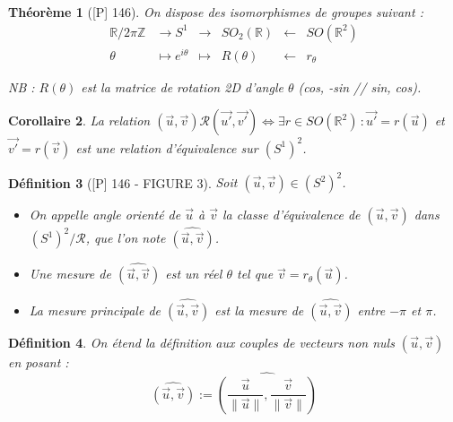 \documentclass[10pt, a4paper, parskip=full, twoside, twocolumn]{report}
\newtheorem{definition}{Définition}
\newtheorem{theorem}[definition]{Théorème}
\newtheorem{corollary}[definition]{Corollaire}
\newcommand{\IZ}{\mathbb{Z}}
\newcommand{\IR}{\mathbb{R}}
\begin{document}
\begin{theorem}[\textnormal{[P] 146}]
	On dispose des isomorphismes de groupes suivant :
	\begin{align*}
		\IR/2\pi\IZ &\longrightarrow S^1 &\longrightarrow &SO_2(\IR) &\longleftarrow &SO(\IR^2) \\
		\theta &\longmapsto e^{i\theta} &\longmapsto &R(\theta) &\longleftarrow &r_{\theta}
	\end{align*}

	NB : $R(\theta)$ est la matrice de rotation 2D d'angle $\theta$ (cos, -sin // sin, cos).
\end{theorem}

\begin{corollary}
	La relation $\left(\overrightarrow{u},\overrightarrow{v}\right)\mathcal{R}\left(\overrightarrow{u'},\overrightarrow{v'}\right) \iff \exists r\in SO(\IR^2)\,\colon \overrightarrow{u'} = r(\overrightarrow{u})$ et $\overrightarrow{v'}=r(\overrightarrow{v})$
	est une relation d'équivalence sur $\left(S^1\right)^2$.
\end{corollary}

\begin{definition}[\textnormal{[P] 146} - FIGURE 3]
	Soit $\left(\overrightarrow{u},\overrightarrow{v}\right)\in\left(S^2\right)^2$.
	\begin{itemize}
		\item[$\vartriangleright$] On appelle \emph{angle orienté de $\overrightarrow{u}$ à $\overrightarrow{v}$} la classe d'équivalence de $\left(\overrightarrow{u},\overrightarrow{v}\right)$ dans $\left(S^1\right)^2/\mathcal{R}$, que l'on note $\widehat{(\overrightarrow{u}, \overrightarrow{v})}$.
		\item[$\vartriangleright$] Une \emph{mesure} de $\widehat{(\overrightarrow{u}, \overrightarrow{v})}$ est un réel $\theta$ tel que $\overrightarrow{v} = r_{\theta}(\overrightarrow{u})$.
		\item[$\vartriangleright$] La \emph{mesure principale} de $\widehat{(\overrightarrow{u}, \overrightarrow{v})}$ est la mesure de $\widehat{(\overrightarrow{u}, \overrightarrow{v})}$ entre $-\pi$ et $\pi$.
	\end{itemize}
\end{definition}

\begin{definition}
	On étend la définition aux couples de vecteurs non nuls $\left(\overrightarrow{u},\overrightarrow{v}\right)$ en posant :
	$$\widehat{\left(\overrightarrow{u},\overrightarrow{v}\right)} := \widehat{\left(\frac{\overrightarrow{u}}{\|\overrightarrow{u}\|},\frac{\overrightarrow{v}}{\|\overrightarrow{v}\|}\right)}$$
\end{definition}
\end{document}

